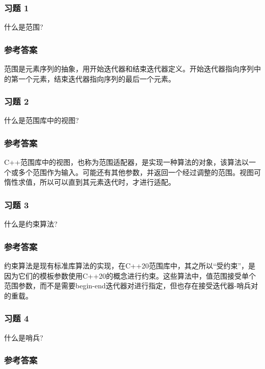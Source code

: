 \subsubsection{习题 1}

什么是范围?

\subsubsection{参考答案}

范围是元素序列的抽象，用开始迭代器和结束迭代器定义。开始迭代器指向序列中的第一个元素，结束迭代器指向序列的最后一个元素。


\subsubsection{习题 2}

什么是范围库中的视图?

\subsubsection{参考答案}

C++范围库中的视图，也称为范围适配器，是实现一种算法的对象，该算法以一个或多个范围作为输入。可能还有其他参数，并返回一个经过调整的范围。视图可惰性求值，所以可以直到其元素迭代时，才进行适配。

\subsubsection{习题 3}

什么是约束算法?

\subsubsection{参考答案}

约束算法是现有标准库算法的实现，在C++20范围库中，其之所以“受约束”，是因为它们的模板参数使用C++20的概念进行约束。这些算法中，值范围接受单个范围参数，而不是需要begin-end迭代器对进行指定，但也存在接受迭代器-哨兵对的重载。

\subsubsection{习题 4}

什么是哨兵?

\subsubsection{参考答案}

